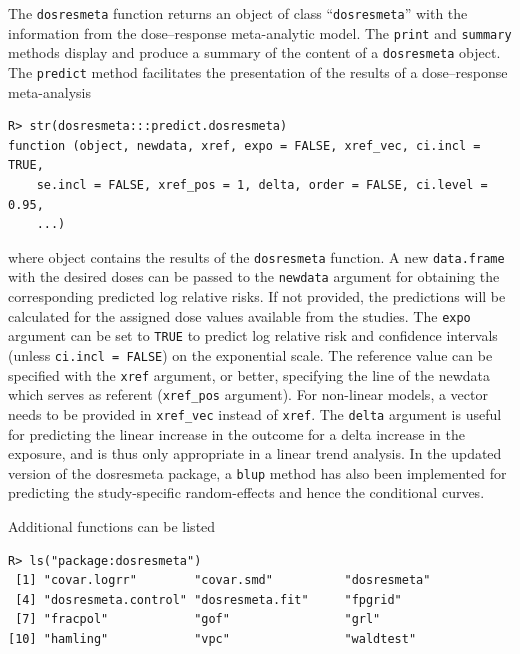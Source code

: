 \documentclass[11pt,a4paper,twoside,openany]{book}\usepackage{knitr}
\newcommand{\pkg}[1]{{\fontseries{b}\selectfont #1}}
\begin{document}
{{The \texttt{dosresmeta} function returns an object of class ``\texttt{dosresmeta}'' with the information from the dose--response meta-analytic model. The \texttt{print} and \texttt{summary} methods display and produce a summary of the content of a \texttt{dosresmeta} object. The \texttt{predict} method facilitates the presentation of the results of a dose--response meta-analysis

\begin{knitrout}\footnotesize
{}\color{fgcolor}\begin{kframe}
\begin{verbatim}
R> str(dosresmeta:::predict.dosresmeta)
function (object, newdata, xref, expo = FALSE, xref_vec, ci.incl = TRUE, 
    se.incl = FALSE, xref_pos = 1, delta, order = FALSE, ci.level = 0.95, 
    ...)  
\end{verbatim}
\end{kframe}
\end{knitrout}

\noindent where object contains the results of the \texttt{dosresmeta} function. A new \texttt{data.frame} with the desired doses can be passed to the \texttt{newdata} argument for obtaining the corresponding predicted log relative risks. If not provided, the predictions will be calculated for the assigned dose values available from the studies. The \texttt{expo} argument can be set to \texttt{TRUE} to predict log relative risk and confidence intervals (unless \texttt{ci.incl = FALSE}) on the exponential scale. The reference value can be specified with the \texttt{xref} argument, or better, specifying the line of the newdata which serves as referent (\texttt{xref\_pos} argument). For non-linear models, a vector needs to be provided in \texttt{xref\_vec} instead of \texttt{xref}. The \texttt{delta} argument is useful for predicting the linear increase in the outcome for a delta increase in the exposure, and is thus only appropriate in a linear trend analysis. In the updated version of the \pkg{dosresmeta} package, a \texttt{blup} method has also been implemented for predicting the study-specific random-effects and hence the conditional curves.

Additional functions can be listed

\begin{knitrout}\footnotesize
{}\color{fgcolor}\begin{kframe}
\begin{verbatim}
R> ls("package:dosresmeta")
 [1] "covar.logrr"        "covar.smd"          "dosresmeta"        
 [4] "dosresmeta.control" "dosresmeta.fit"     "fpgrid"            
 [7] "fracpol"            "gof"                "grl"               
[10] "hamling"            "vpc"                "waldtest"          
\end{verbatim}
\end{kframe}
\end{knitrout}

}}
\end{document}
